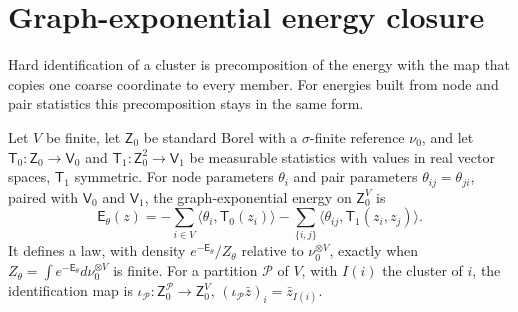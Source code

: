 \section{Graph-exponential energy closure}
\label{sec:cg-graph-exponential}

Hard identification of a cluster is precomposition of the energy with the map
that copies one coarse coordinate to every member. For energies built from node
and pair statistics this precomposition stays in the same form.

Let \(V\) be finite, let \(\mathsf Z_0\) be standard Borel with a
\(\sigma\)-finite reference \(\nu_0\), and let
\(\mathsf T_0:\mathsf Z_0\to\mathsf V_0\) and \(\mathsf T_1:\mathsf Z_0^2\to\mathsf V_1\) be
measurable statistics with values in real vector spaces, \(\mathsf T_1\) symmetric.
For node parameters \(\theta_i\) and pair parameters
\(\theta_{ij}=\theta_{ji}\), paired with \(\mathsf V_0\) and \(\mathsf V_1\),
the graph-exponential energy on \(\mathsf Z_0^V\) is
\begin{equation}
\mathsf E_\theta(z)
=-\sum_{i\in V}\langle\theta_i,\mathsf T_0(z_i)\rangle
-\sum_{\{i,j\}}\langle\theta_{ij},\mathsf T_1(z_i,z_j)\rangle .
\label{eq:cg-graph-energy}
\end{equation}
It defines a law, with density \(e^{-\mathsf E_\theta}/Z_\theta\) relative to
\(\nu_0^{\otimes V}\), exactly when
\(Z_\theta=\int e^{-\mathsf E_\theta}d\nu_0^{\otimes V}\) is finite. For a
partition \(\mathcal P\) of \(V\), with \(I(i)\) the cluster of \(i\), the
identification map is
\(\iota_{\mathcal P}:\mathsf Z_0^{\mathcal P}\to\mathsf Z_0^V\),
\((\iota_{\mathcal P}\bar z)_i=\bar z_{I(i)}\).

